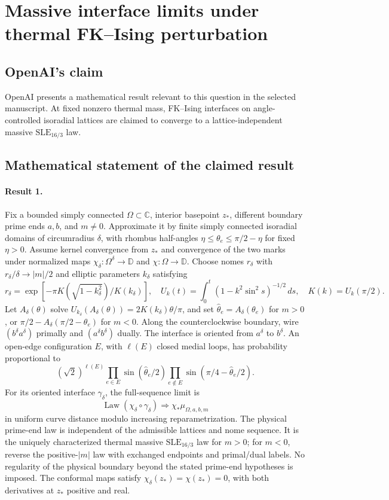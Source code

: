 \documentclass[11pt]{article}
\begin{document}
\section*{Massive interface limits under thermal FK–Ising perturbation}

\subsection{OpenAI's claim}
OpenAI presents a mathematical result relevant to this question in the selected manuscript. At fixed nonzero thermal mass, FK--Ising interfaces on angle-controlled isoradial lattices are claimed to converge to a lattice-independent massive $\mathrm{SLE}_{16/3}$ law.

\subsection{Mathematical statement of the claimed result}
\paragraph{Result 1.} Fix a bounded simply connected $\Omega\subset\mathbb C$, interior basepoint $z_*$, different boundary prime ends $a,b$, and $m\ne0$. Approximate it by finite simply connected isoradial domains of circumradius $\delta$, with rhombus half-angles $\eta\le\theta_e\le\pi/2-\eta$ for fixed $\eta>0$. Assume kernel convergence from $z_*$ and convergence of the two marks under normalized maps $\chi_\delta:\Omega^\delta\to\mathbb D$ and $\chi:\Omega\to\mathbb D$. Choose nomes $r_\delta$ with $r_\delta/\delta\to|m|/2$ and elliptic parameters $k_\delta$ satisfying
\[
 r_\delta=\exp[-\pi K(\sqrt{1-k_\delta^2})/K(k_\delta)],\quad
 U_k(t)=\int_0^t(1-k^2\sin^2s)^{-1/2}\,ds,\quad K(k)=U_k(\pi/2).
\]
Let $A_\delta(\theta)$ solve $U_{k_\delta}(A_\delta(\theta))=2K(k_\delta)\theta/\pi$, and set $\widehat\theta_e=A_\delta(\theta_e)$ for $m>0$, or $\pi/2-A_\delta(\pi/2-\theta_e)$ for $m<0$. Along the counterclockwise boundary, wire $(b^\delta a^\delta)$ primally and $(a^\delta b^\delta)$ dually. The interface is oriented from $a^\delta$ to $b^\delta$. An open-edge configuration $E$, with $\ell(E)$ closed medial loops, has probability proportional to
\[
 (\sqrt2)^{\ell(E)}\prod_{e\in E}\sin(\widehat\theta_e/2)
 \prod_{e\notin E}\sin(\pi/4-\widehat\theta_e/2).
\]
For its oriented interface $\gamma_\delta$, the full-sequence limit is
\[
 \operatorname{Law}(\chi_\delta\circ\gamma_\delta)\Longrightarrow\chi_*\mu_{\Omega,a,b,m}
\]
in uniform curve distance modulo increasing reparametrization. The physical prime-end law is independent of the admissible lattices and nome sequence. It is the uniquely characterized thermal massive $\mathrm{SLE}_{16/3}$ law for $m>0$; for $m<0$, reverse the positive-$|m|$ law with exchanged endpoints and primal/dual labels. No regularity of the physical boundary beyond the stated prime-end hypotheses is imposed. The conformal maps satisfy $\chi_\delta(z_*)=\chi(z_*)=0$, with both derivatives at $z_*$ positive and real.
\end{document}
